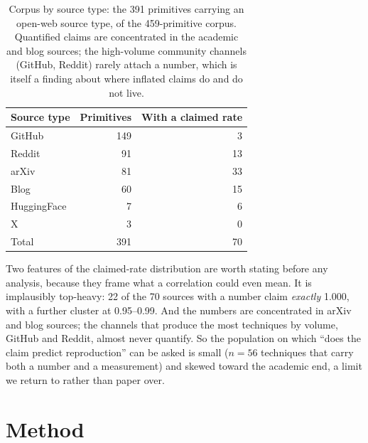 \documentclass[letterpaper,twocolumn,10pt]{article}
\begin{document}
\begin{table}[h]
\centering
\caption{Corpus by source type: the 391 primitives carrying an open-web source type, of the 459-primitive corpus. Quantified claims are concentrated in the academic and blog sources; the high-volume community channels (GitHub, Reddit) rarely attach a number, which is itself a finding about where inflated claims do and do not live.}
\label{tab:corpus}
\begin{tabular}{lrr}
\toprule
Source type & Primitives & With a claimed rate \\
\midrule
GitHub      & 149 & 3  \\
Reddit      & 91  & 13 \\
arXiv       & 81  & 33 \\
Blog        & 60  & 15 \\
HuggingFace & 7   & 6  \\
X           & 3   & 0  \\
\midrule
Total       & 391 & 70 \\
\bottomrule
\end{tabular}
\end{table}

Two features of the claimed-rate distribution are worth stating before any analysis, because they frame what a correlation could even mean. It is implausibly top-heavy: 22 of the 70 sources with a number claim \emph{exactly} 1.000, with a further cluster at 0.95--0.99. And the numbers are concentrated in arXiv and blog sources; the channels that produce the most techniques by volume, GitHub and Reddit, almost never quantify. So the population on which ``does the claim predict reproduction'' can be asked is small ($n{=}56$ techniques that carry both a number and a measurement) and skewed toward the academic end, a limit we return to rather than paper over.

\section{Method}
\label{sec:method}
\end{document}
